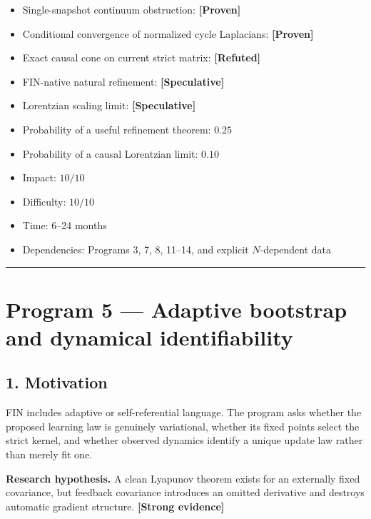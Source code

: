 \documentclass[11pt,a4paper,openany]{report}
\newcommand{\statusProven}{\textcolor{fingreen}{[Proven]}}
\newcommand{\statusStrong}{\textcolor{finblue}{[Strong evidence]}}
\newcommand{\statusSpeculative}{\textcolor{finorange}{[Speculative]}}
\newcommand{\statusRefuted}{\textcolor{finred}{[Refuted]}}
\begin{document}
\begin{itemize}
\item 
Single-snapshot continuum obstruction: \textbf{\statusProven{}}

\item 
Conditional convergence of normalized cycle Laplacians: \textbf{\statusProven{}}

\item 
Exact causal cone on current strict matrix: \textbf{\statusRefuted{}}

\item 
FIN-native natural refinement: \textbf{\statusSpeculative{}}

\item 
Lorentzian scaling limit: \textbf{\statusSpeculative{}}

\item 
Probability of a useful refinement theorem: \(0.25\)

\item 
Probability of a causal Lorentzian limit: \(0.10\)

\item 
Impact: \(10/10\)

\item 
Difficulty: \(10/10\)

\item 
Time: 6–24 months

\item 
Dependencies: Programs 3, 7, 8, 11–14, and explicit \(N\)-dependent data

\end{itemize}

\par\medskip\hrule\medskip

\chapter{Program 5 — Adaptive bootstrap and dynamical identifiability}

\section{1. Motivation}

FIN includes adaptive or self-referential language. The program asks whether the proposed learning law is genuinely variational, whether its fixed points select the strict kernel, and whether observed dynamics identify a unique update law rather than merely fit one.

\textbf{Research hypothesis.} A clean Lyapunov theorem exists for an externally fixed covariance, but feedback covariance introduces an omitted derivative and destroys automatic gradient structure. \textbf{\statusStrong{}}
\end{document}
